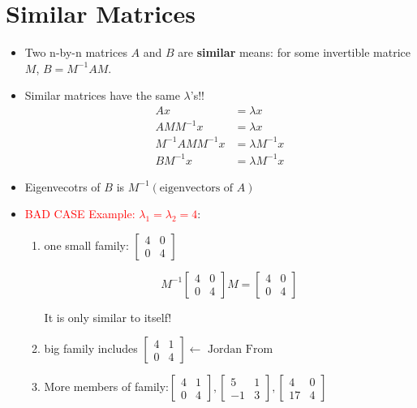 \documentclass[a4paper,12pt]{article}
\newcommand{\red}[1]{\textcolor{red}{#1}}
\theoremstyle{definition} \newtheorem{Theorem}{Theorem}
\begin{document}
\section{Similar Matrices}
\begin{itemize}
\item Two n-by-n matrices $A$ and $B$ are \textbf{similar} means: for some invertible matrice $M$,
 $B = M^{-1} A M$.
\item Similar matrices have the same $\lambda$'s!!
		\begin{align*}
		Ax &= \lambda x \\
		AMM^{-1}x &= \lambda x \\
		M^{-1}AM M^{-1} x &= \lambda M^{-1} x \\
		B M^{-1}x &= \lambda M^{-1}x
		\end{align*}

\item Eigenvecotrs of $B$ is $M^{-1}(\text{eigenvectors of } A)$
\item \red{BAD CASE Example: $\lambda_1 = \lambda_2 = 4$}:
\begin{enumerate}
\item one small family: $\begin{bmatrix}4 & 0 \\ 0 & 4\end{bmatrix}$

			\begin{equation*}
			M^{-1}\begin{bmatrix}4 & 0 \\ 0 & 4\end{bmatrix}M = \begin{bmatrix}4 & 0 \\ 0 & 4\end{bmatrix}
			\end{equation*}

			It is only similar to itself!
\item big family includes $\begin{bmatrix}4 & 1 \\ 0 & 4\end{bmatrix} \leftarrow \text{ Jordan From}$

\item More members of family:$\begin{bmatrix}4 & 1 \\ 0 & 4\end{bmatrix}, \begin{bmatrix}5 & 1 \\ -1 & 3\end{bmatrix},
\begin{bmatrix}4 & 0 \\ 17 & 4\end{bmatrix} $

\end{enumerate}
\end{itemize}
\end{document}
